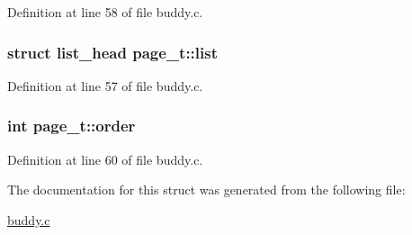 Definition at line 58 of file buddy.\+c.

\subsubsection[{\texorpdfstring{list}{list}}]{\setlength{\rightskip}{0pt plus 5cm}struct {\bf list\+\_\+head} page\+\_\+t\+::list}\hypertarget{structpage__t_a97306c6fff4f6280e8e8049412091475}{}\label{structpage__t_a97306c6fff4f6280e8e8049412091475}


Definition at line 57 of file buddy.\+c.

\subsubsection[{\texorpdfstring{order}{order}}]{\setlength{\rightskip}{0pt plus 5cm}int page\+\_\+t\+::order}\hypertarget{structpage__t_aeb4724e8b59033b5373a965e16ce86ad}{}\label{structpage__t_aeb4724e8b59033b5373a965e16ce86ad}


Definition at line 60 of file buddy.\+c.



The documentation for this struct was generated from the following file\+:\begin{DoxyCompactItemize}
\item 
\hyperlink{buddy_8c}{buddy.\+c}\end{DoxyCompactItemize}
